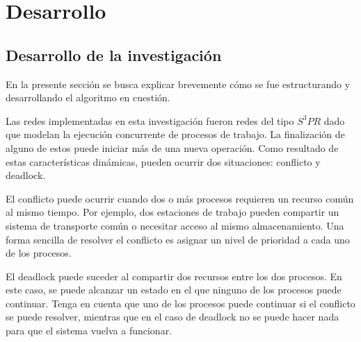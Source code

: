 
\chapter{Desarrollo} %

\label{Chapter3} %


\section{Desarrollo de la investigación}

En la presente sección se busca explicar brevemente cómo se fue estructurando y desarrollando el algoritmo en cuestión. 

Las redes implementadas en esta investigación fueron redes del tipo $S^3PR$ dado que modelan la ejecución concurrente de procesos de trabajo. La finalización de alguno de estos puede iniciar más de una nueva operación. Como resultado de estas características dinámicas, pueden ocurrir dos situaciones: conflicto y deadlock. 

El conflicto puede ocurrir cuando dos o más procesos requieren un recurso común al mismo tiempo. Por ejemplo, dos estaciones de trabajo pueden compartir un sistema de transporte común o necesitar acceso al mismo almacenamiento. Una forma sencilla de resolver el conflicto es asignar un nivel de prioridad a cada uno de los procesos. 

El deadlock puede suceder al compartir dos recursos entre los dos procesos. En este caso, se puede alcanzar un estado en el que ninguno de los procesos puede continuar. Tenga en cuenta que uno de los procesos puede continuar si el conflicto se puede resolver, mientras que en el caso de deadlock no se puede hacer nada para que el sistema vuelva a funcionar.


